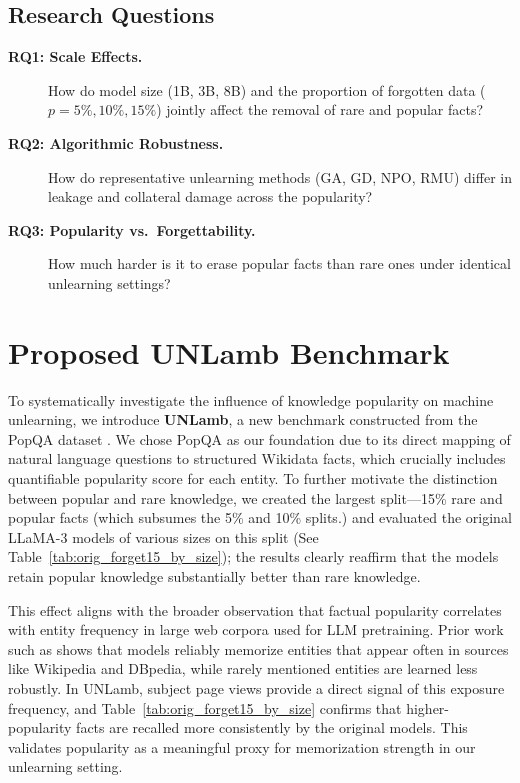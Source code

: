 \documentclass[11pt]{article}
\begin{document}
{\subsection{Research Questions}
\label{sec:rq}


\begin{description}
    \item[\textbf{RQ1: Scale Effects.}]  
     How do model size (1B, 3B, 8B) and the proportion of forgotten data ($p=5\%,10\%,15\%$) jointly affect the removal of rare and popular facts?

     \item[\textbf{RQ2: Algorithmic Robustness.}]  
    How do representative unlearning methods (\textsc{GA}, \textsc{GD}, \textsc{NPO}, \textsc{RMU}) differ in leakage and collateral damage across the popularity?

     \item[\textbf{RQ3: Popularity vs.\ Forgettability.}]  
    How much harder is it to erase popular facts than rare ones under identical unlearning settings?
\end{description}







\section{Proposed UNLamb Benchmark}
\label{sec:benchmark}

To systematically investigate the influence of knowledge popularity on machine unlearning, we introduce \textbf{UNLamb}, a new benchmark constructed from the PopQA dataset \cite{mallen2023not}. We chose PopQA as our foundation due to its direct mapping of natural language questions to structured Wikidata facts, which crucially includes quantifiable popularity score for each entity.
To further motivate the distinction between popular and rare knowledge, we created the largest split—15\% rare and popular facts (which subsumes the 5\% and 10\% splits.)
and evaluated the original LLaMA-3 models of various sizes on this split (See Table~\ref{tab:orig_forget15_by_size}); the results clearly reaffirm that the models retain popular knowledge substantially better than rare knowledge.


This effect aligns with the broader observation that factual popularity correlates with entity frequency in large web corpora used for LLM pretraining. Prior work such as \cite{sun2023head} shows that models reliably memorize entities that appear often in sources like Wikipedia and DBpedia, while rarely mentioned entities are learned less robustly. In UNLamb, subject page views provide a direct signal of this exposure frequency, and Table~\ref{tab:orig_forget15_by_size} confirms that higher-popularity facts are recalled more consistently by the original models. This validates popularity as a meaningful proxy for memorization strength in our unlearning setting.


}
\end{document}

